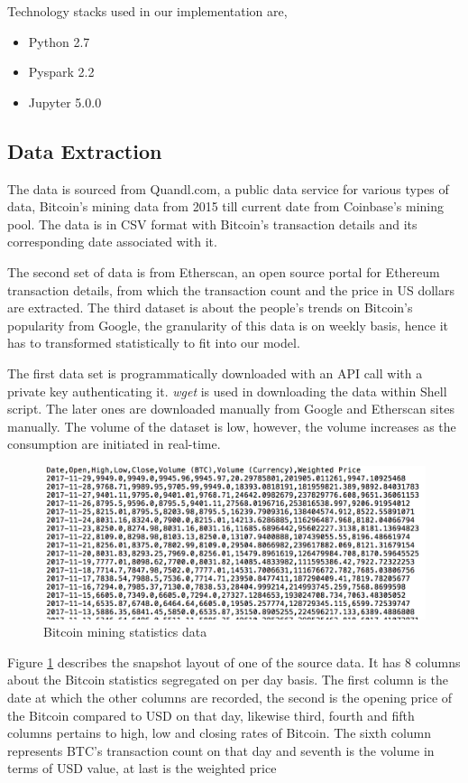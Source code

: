 \documentclass[sigconf]{acmart}
\begin{document}
Technology stacks used in our implementation are, 
\begin{itemize}
\item Python 2.7 
\item Pyspark 2.2
\item Jupyter 5.0.0
\end{itemize}


\subsection{Data Extraction}
The data is sourced from Quandl.com, a public data service for various types of data, Bitcoin's mining data from 2015 till current date from Coinbase's mining pool. The data is in CSV format with Bitcoin's transaction details and its corresponding date associated with it.

The second set of data is from Etherscan, an open source portal for Ethereum transaction details, from which the transaction count and the price in US dollars are extracted.
The third dataset is about the people's trends on Bitcoin's popularity from Google, the granularity of this data is on weekly basis, hence it has to transformed statistically to fit into our model.

The first data set is programmatically downloaded with an API call with a private key authenticating it. {\em wget } is used in downloading the data within Shell script.
The later ones are downloaded manually from Google and Etherscan sites manually. The volume of the dataset is low, however, the volume increases as the consumption are initiated in real-time.

\begin{figure}[!ht]
  \centering\includegraphics[width=\columnwidth]{images/Source1data.png}
  \caption{Bitcoin mining statistics data \cite{3:online}}
  \label{fig:sourcedata}
\end{figure}


Figure \ref{fig:sourcedata} describes the snapshot layout of one of the source data. It has 8 columns about the Bitcoin statistics segregated on per day basis. The first column is the date at which the other columns are recorded, the second is the opening price of the Bitcoin compared to USD on that day, likewise third, fourth and fifth columns pertains to high, low and closing rates of Bitcoin. The sixth column represents BTC's transaction count on that day and seventh is the volume in terms of USD value, at last is the weighted price 
\end{document}

